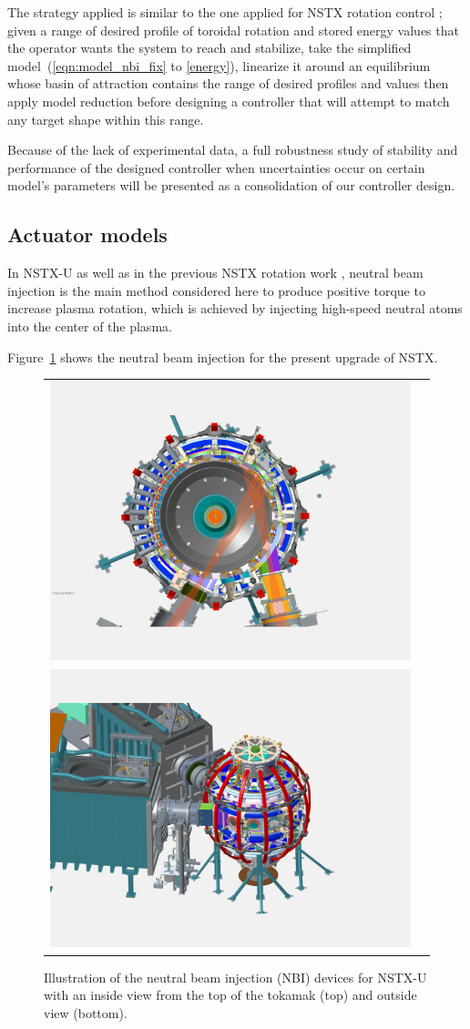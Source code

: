 \documentclass[12pt,lot, lof]{puthesis}
\begin{document}
The strategy applied is similar to the one applied for NSTX rotation control \cite{Goumiri15}; given a range of desired profile of toroidal rotation and stored energy values that the operator wants the system to reach and stabilize, take the simplified model~(\ref{eqn:model_nbi_fix} to \ref{energy}), linearize it around an equilibrium whose basin of attraction contains the range of desired profiles and values then apply model reduction before designing a controller that will attempt to match any target shape within this range.

Because of the lack of experimental data, a full robustness study of stability and performance of the designed controller when uncertainties occur on certain model's parameters will be presented as a consolidation of our controller design.

\subsection{Actuator models}
In NSTX-U as well as in the previous NSTX rotation work \cite{Goumiri15}, neutral beam injection is the main method considered here to produce positive torque to increase plasma rotation, which is achieved  by injecting high-speed neutral atoms into the center of the plasma. 

Figure~{\ref{NBI_pics}} shows the neutral beam injection for the present upgrade of NSTX. 
\begin{figure}
\centering
\begin{tabular}{cc}
\includegraphics[width=0.6\linewidth]{chap10/fig3a} \\
\includegraphics[width=0.6\linewidth]{chap10/fig3b}
\end{tabular}
\caption{Illustration of the neutral beam injection (NBI) devices for NSTX-U with an inside view from the top of the tokamak (top) and outside view (bottom).}
\label{NBI_pics}
\end{figure}
\end{document}
